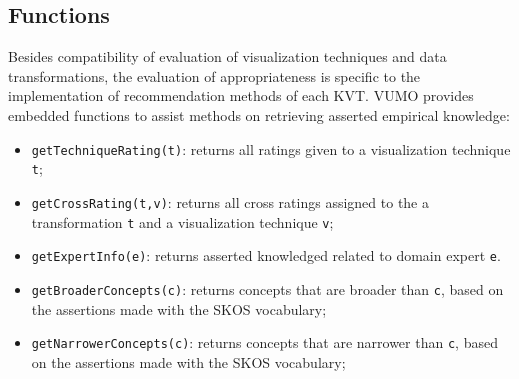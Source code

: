 \documentclass[]{interact}
\theoremstyle{plain}%
\theoremstyle{definition}
\theoremstyle{remark}
\theoremstyle{definition}
\begin{document}






\subsection{Functions}

Besides compatibility of evaluation of visualization techniques and data transformations, the evaluation of appropriateness is specific to the implementation of recommendation methods of each KVT. VUMO provides embedded functions to assist methods on retrieving asserted empirical knowledge:

\begin{itemize}
    \item \texttt{getTechniqueRating(t)}: returns all ratings given to a visualization technique \texttt{t};
    \item \texttt{getCrossRating(t,v)}: returns all cross ratings assigned to the a transformation \texttt{t} and a visualization technique \texttt{v};
    \item \texttt{getExpertInfo(e)}: returns asserted knowledged related to domain expert \texttt{e}.
    \item \texttt{getBroaderConcepts(c)}: returns concepts that are broader than \texttt{c}, based on the assertions made with the SKOS vocabulary;
    \item \texttt{getNarrowerConcepts(c)}: returns concepts that are narrower than \texttt{c}, based on the assertions made with the SKOS vocabulary;
\end{itemize}
\end{document}
